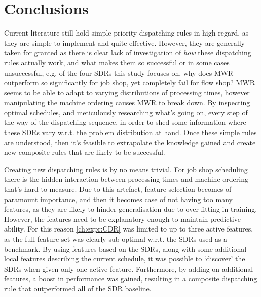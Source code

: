 \documentclass[smallextended]{svjour3}
\begin{document}
	
	
	\section{Conclusions}\label{sec:con}
	
	Current literature still hold simple priority dispatching rules in high regard, as they are simple to implement and quite effective. However, they are generally taken for granted as there is clear lack of investigation of \emph{how} these dispatching rules actually work, and what makes them so successful or in some cases unsuccessful, e.g. of the four SDRs this study focuses on, why does MWR outperform so significantly for job shop, yet completely fail for flow shop? MWR seems to be able to adapt to varying distributions of processing times, however manipulating the machine ordering causes MWR to break down. By inspecting optimal schedules, and meticulously researching what's going on, every step of the way of the dispatching sequence, in order to shed some information where these SDRs vary w.r.t. the problem distribution at hand. Once these simple rules are understood, then it's feasible to extrapolate the knowledge gained and create new composite rules that are likely to be successful. 
	
	Creating new dispatching rules is by no means trivial. For job shop scheduling there is the hidden interaction between processing times and machine ordering that's hard to measure. Due to this artefact, feature selection becomes of paramount importance, and then it becomes case of not having too many features, as they are likely to hinder generalisation due to over-fitting in training. However, the features need to be explanatory enough to maintain predictive ability. For this reason \cref{ch:expr:CDR} was limited to up to three active features, as the full feature set was clearly sub-optimal w.r.t. the SDRs used as a benchmark. By using features based on the SDRs, along with some additional local features describing the current schedule, it was possible to `discover' the SDRs when given only one active feature. %
	Furthermore, by adding on additional features, a boost in performance was gained, resulting in a composite dispatching rule that outperformed all of the SDR baseline. 
	
\end{document}

